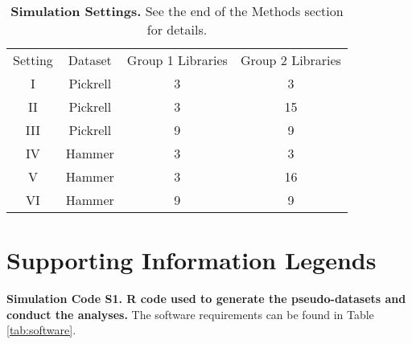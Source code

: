 \documentclass[10pt]{article}
\begin{document}
\begin{table}[!ht] %
   \centering
   \caption{{\bf Simulation Settings.} See the end of the Methods section for details.}
\begin{tabular}{|c|c|c|c|}
Setting & Dataset & Group 1 Libraries & Group 2 Libraries \\
I & Pickrell & 3 & 3 \\
II & Pickrell & 3 & 15 \\
III & Pickrell & 9 & 9 \\
IV & Hammer & 3 & 3 \\
V & Hammer & 3 & 16 \\
VI & Hammer & 9 & 9 \\
\end{tabular}
   \label{tab:simset}
\end{table}


\section*{Supporting Information Legends}

{{\bf Simulation Code S1. R code used to generate the pseudo-datasets and conduct the analyses.} The software requirements can be found in Table \ref{tab:software}.}
\end{document}
